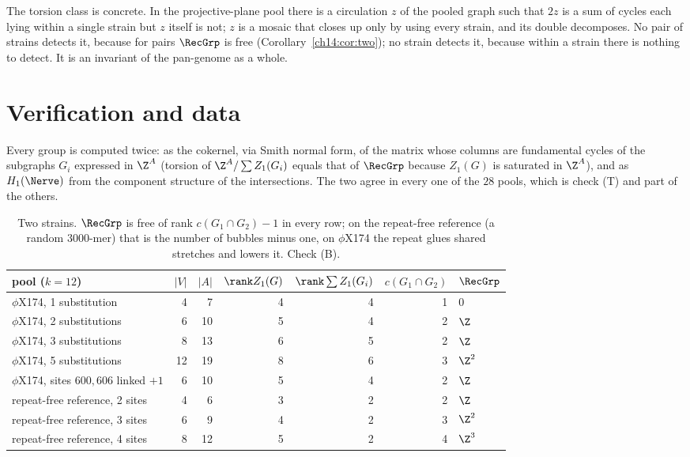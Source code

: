 The torsion class is concrete. In the projective-plane pool there is a circulation $z$ of the
pooled graph such that $2z$ is a sum of cycles each lying within a single strain but $z$
itself is not; $z$ is a mosaic that closes up only by using every strain, and its double
decomposes. No pair of strains detects it, because for pairs $\RecGrp$ is free
(Corollary~\ref{ch14:cor:two}); no strain detects it, because within a strain there is nothing to
detect. It is an invariant of the pan-genome as a whole.

\section{Verification and data}\label{ch14:sec:data}

Every group is computed twice: as the cokernel, via Smith normal form, of the matrix whose
columns are fundamental cycles of the subgraphs $G_i$ expressed in $\Z^A$ (torsion of
$\Z^A/\sum Z_1(G_i)$ equals that of $\RecGrp$ because $Z_1(G)$ is saturated in $\Z^A$), and as
$H_1(\Nerve)$ from the component structure of the intersections. The two agree in every one
of the $28$ pools, which is check (T) and part of the others.

\begin{table}[t]
\centering
\small
\begin{tabular}{lrrrrrl}
\toprule
pool ($k=12$) & $|V|$ & $|A|$ & $\rank Z_1(G)$ & $\rank\sum Z_1(G_i)$ & $c(G_1\cap G_2)$ & $\RecGrp$\\
\midrule
$\phi$X174, 1 substitution          &  4 &  7 & 4 & 4 & 1 & $0$\\
$\phi$X174, 2 substitutions         &  6 & 10 & 5 & 4 & 2 & $\Z$\\
$\phi$X174, 3 substitutions         &  8 & 13 & 6 & 5 & 2 & $\Z$\\
$\phi$X174, 5 substitutions         & 12 & 19 & 8 & 6 & 3 & $\Z^2$\\
$\phi$X174, sites $600,606$ linked $+1$ & 6 & 10 & 5 & 4 & 2 & $\Z$\\
repeat-free reference, 2 sites      &  4 &  6 & 3 & 2 & 2 & $\Z$\\
repeat-free reference, 3 sites      &  6 &  9 & 4 & 2 & 3 & $\Z^2$\\
repeat-free reference, 4 sites      &  8 & 12 & 5 & 2 & 4 & $\Z^3$\\
\bottomrule
\end{tabular}
\caption{Two strains. $\RecGrp$ is free of rank $c(G_1\cap G_2)-1$ in every row; on the
repeat-free reference (a random $3000$-mer) that is the number of bubbles minus one, on
$\phi$X174 the repeat glues shared stretches and lowers it. Check (B).}
\label{ch14:tab:two}
\end{table}

